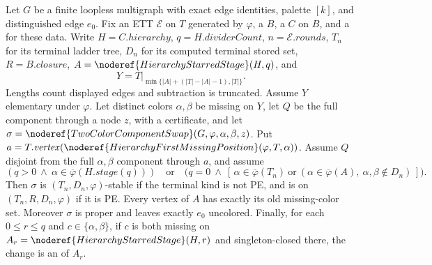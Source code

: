 \begin{helper}
Let $G$ be a finite loopless multigraph with exact edge identities, palette
$[k]$, and distinguished edge $e_0$.  Fix an ETT $\mathcal E$ on $T$
generated by $\varphi$, a  $B$, a
 $C$ on $B$, and a
 for these data.
Write $H=C.\mathit{hierarchy}$, $q=H.\mathit{dividerCount}$,
$n=\mathcal E.\mathit{rounds}$, $T_n$ for its terminal ladder tree,
$D_n$ for its computed terminal stored set, $R=B.\mathit{closure}$,
$A=\noderef{HierarchyStarredStage}(H,q)$, and
\[
 Y=T|_{\min\{|A|+(|T|-|A|-1),|T|\}}.
\]
Lengths count displayed edges and subtraction is truncated.  Assume
$Y$ elementary under $\varphi$.  Let distinct colors $\alpha,\beta$ be
missing on $Y$, let $Q$ be the full component through a node $z$, with a
 certificate, and let
$\sigma=\noderef{TwoColorComponentSwap}(G,\varphi,\alpha,\beta,z)$.
Put $a=T.\mathit{vertex}(\noderef{HierarchyFirstMissingPosition}(\varphi,T,\alpha))$.
Assume $Q$ disjoint from the full $\alpha,\beta$ component through $a$, and
assume
\[
 (q>0\ \land\ \alpha\in\overline\varphi(H.\mathit{stage}(q)))
 \quad\text{or}\quad
 \bigl(q=0\ \land\
   [\,\alpha\in\overline\varphi(T_n)\ \text{or}\
      (\alpha\in\overline\varphi(A),\ \alpha,\beta\notin D_n)\,]\bigr).
\]
Then $\sigma$ is $(T_n,D_n,\varphi)$-stable if the terminal kind is not PE,
and is  on $(T_n,R,D_n,\varphi)$ if it is PE.
Every vertex of $A$ has exactly its old missing-color set.  Moreover
$\sigma$ is proper and leaves exactly $e_0$ uncolored.  Finally, for each
$0\le r\le q$ and $c\in\{\alpha,\beta\}$, if $c$ is both missing on
$A_r=\noderef{HierarchyStarredStage}(H,r)$ and singleton-closed there,
the change is an \noderef{OutsideKempeRecoloring} of $A_r$.
\end{helper}
